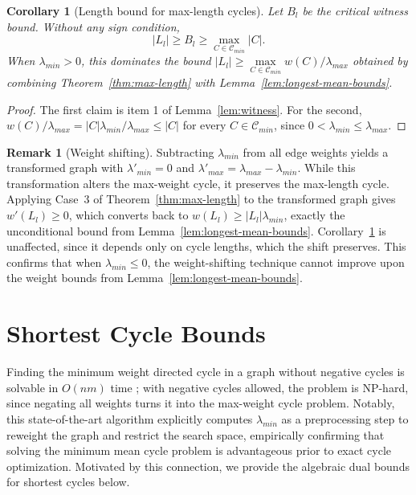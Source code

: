 \documentclass{article}
\newtheorem{cor}{Corollary}[section]
\theoremstyle{definition}
\newtheorem{remark}{Remark}
\begin{document}
\begin{cor}[Length bound for max-length cycles]
  \label{cor:max-length-length-bound}
  Let $B_l$ be the critical witness bound. Without any sign condition,
  \begin{equation}
    |L_l| \geq B_l \geq \max\limits_{C \in \mathcal{C}_{min}} |C|.
  \end{equation}
  When $\lambda_{min} > 0$, this dominates the bound $|L_l| \geq
  \max\limits_{C \in \mathcal{C}_{min}} w(C)/\lambda_{max}$ obtained by
  combining Theorem~\ref{thm:max-length} with
  Lemma~\ref{lem:longest-mean-bounds}.
\end{cor}

\begin{proof}
  The first claim is item 1 of Lemma~\ref{lem:witness}. For the
  second, $w(C)/\lambda_{max} = |C|\lambda_{min}/\lambda_{max} \leq
  |C|$ for every $C \in \mathcal{C}_{min}$, since $0 < \lambda_{min}
  \leq \lambda_{max}$.
\end{proof}

\begin{remark}[Weight shifting]
  \label{rem:weight-shift}
  Subtracting $\lambda_{min}$ from all edge weights yields a
  transformed graph with $\lambda'_{min} = 0$ and $\lambda'_{max} =
  \lambda_{max} - \lambda_{min}$. While this transformation alters the
  max-weight cycle, it preserves the max-length cycle. Applying Case~3
  of Theorem~\ref{thm:max-length} to the transformed graph gives
  $w'(L_l) \geq 0$, which converts back to $w(L_l) \geq
  |L_l|\lambda_{min}$, exactly the unconditional bound from
  Lemma~\ref{lem:longest-mean-bounds}. Corollary~\ref{cor:max-length-length-bound}
  is unaffected, since it depends only on cycle lengths, which the
  shift preserves. This confirms that when $\lambda_{min} \leq 0$,
  the weight-shifting technique cannot improve upon the weight bounds
  from Lemma~\ref{lem:longest-mean-bounds}.
\end{remark}

\section{Shortest Cycle Bounds}
\label{sec:shortest-results}

Finding the minimum weight directed cycle in a graph without negative
cycles is solvable in $O(nm)$ time \citep{OrSe2017}; with negative
cycles allowed, the problem is NP-hard, since negating all weights
turns it into the max-weight cycle problem. Notably, this
state-of-the-art algorithm explicitly computes $\lambda_{min}$ as a
preprocessing step to reweight the graph
and restrict the search space, empirically confirming that solving the
minimum mean cycle problem is advantageous prior to exact cycle
optimization. Motivated by this connection, we provide the algebraic
dual bounds for shortest cycles below.
\end{document}
